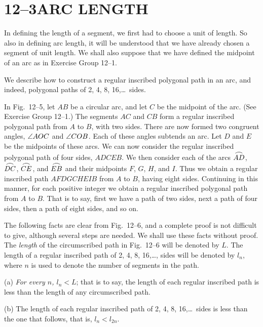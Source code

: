 \documentclass[11pt]{book}
\newcommand{\XIIarc}[1]{\overset{\raisebox{-0.25ex}{\scalebox{1.15}[0.85]{$\frown$}}}{#1}}
\begin{document}
\section*{12--3\quad ARC LENGTH}

In defining the length of a segment, we first had to choose a unit of length.
So also in defining arc length, it will be understood that we have already
chosen a segment of unit length. We shall also suppose that we have defined the
midpoint of an arc as in Exercise Group 12--1.

We describe how to construct a regular inscribed polygonal path in an arc, and
indeed, polygonal paths of 2, 4, 8, 16,\ldots\ sides.

In Fig.~12--5, let $AB$ be a circular arc, and let $C$ be the midpoint of the
arc. (See Exercise Group 12--1.) The segments $AC$ and $CB$ form a regular
inscribed polygonal path from $A$ to $B$, with two sides. There are now formed
two congruent angles, $\angle AOC$ and $\angle COB$. Each of these angles subtends
an arc. Let $D$ and $E$ be the midpoints of these arcs. We can now consider the
regular inscribed polygonal path of four sides, $ADCEB$. We then consider each
of the arcs $\XIIarc{AD}$, $\XIIarc{DC}$, $\XIIarc{CE}$, and $\XIIarc{EB}$ and
their midpoints $F$, $G$, $H$, and $I$. Thus we obtain a regular inscribed path
$AFDGCHEIB$ from $A$ to $B$, having eight sides. Continuing in this manner, for
each positive integer we obtain a regular inscribed polygonal path from $A$ to
$B$. That is to say, first we have a path of two sides, next a path of four
sides, then a path of eight sides, and so on.

\FIGXIIFIVESIX

The following facts are clear from Fig.~12--6, and a complete proof is not
difficult to give, although several steps are needed. We shall use these facts
without proof. The \emph{length} of the circumscribed path in Fig.~12--6 will be
denoted by $L$. The length of a regular inscribed path of 2, 4, 8,
16,\ldots, sides will be denoted by $l_n$, where $n$ is used to denote the
number of segments in the path.

(a) \emph{For every $n$, $l_n < L$}; that is to say, the length of each regular
inscribed path is less than the length of any circumscribed path.

(b) The length of each regular inscribed path of 2, 4, 8, 16,\ldots\ sides is
less than the one that follows, that is, $l_n < l_{2n}$.
\end{document}
